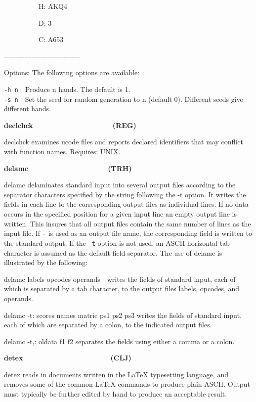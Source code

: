 {\ttfamily
\ \ \ \ \ \ \ \ \ \ H: AKQ4}

{\ttfamily
\ \ \ \ \ \ \ \ \ \ D: 3}

{\ttfamily
\ \ \ \ \ \ \ \ \ \ C: A653}

{\ttfamily
{}-{}-{}-{}-{}-{}-{}-{}-{}-{}-{}-{}-{}-{}-{}-{}-{}-{}-{}-{}-{}-{}-{}-{}-{}-{}-{}-{}-{}-{}-{}-{}-{}-}

Options: The following options are available:

\texttt{{}-h n}\ \ Produce n hands. The default is 1.\\
\texttt{{}-s n}\ \ Set the seed for random generation to n (default 0).
Different seeds give different hands.

{\sffamily\bfseries
declchck\ \ \ \ \ \ \ \ \ \ \ \ \ \ \ \ \ \ \ \ (REG)}

\textsf{declchck} examines ucode files and reports declared identifiers
that may conflict with function names. Requires: UNIX. 

{\sffamily\bfseries
delamc\ \ \ \ \ \ \ \ \ \ \ \ \ \ \ \ \ \ \ \ (TRH)}

\textsf{delamc} delaminates standard input into several output files
according to the separator characters specified by the string following
the -t option. It writes the fields in each line to the corresponding
output files as individual lines. If no data occurs in the specified
position for a given input line an empty output line is written. This
insures that all output files contain the same number of lines as the
input file. If \texttt{{}-} is used as an output file name, the
corresponding field is written to the standard output. If the
\texttt{{}-t} option is not used, an ASCII horizontal tab character is
assumed as the default field separator. The use of delamc is
illustrated by the following:

\textsf{delamc labels opcodes operands}\ \ writes the fields of standard
input, each of which is separated by a tab character, to the output
files \textsf{labels}, \textsf{opcodes}, and \textsf{operands}.

\textsf{delamc -t: scores names matric ps1 ps2 ps3} writes the fields of
standard input, each of which are separated by a colon, to the
indicated output files.

\textsf{delamc -t,: oldata f1 f2} separates the fields using either a
comma or a colon.

{\sffamily\bfseries
detex\ \ \ \ \ \ \ \ \ \ \ \ \ \ \ \ \ \ \ \ \ \ (CLJ)}

\textsf{detex} reads in documents written in the LaTeX
typesetting language, and removes some of the common LaTeX commands to
produce plain ASCII. Output must typically be further
edited by hand to produce an acceptable result.

